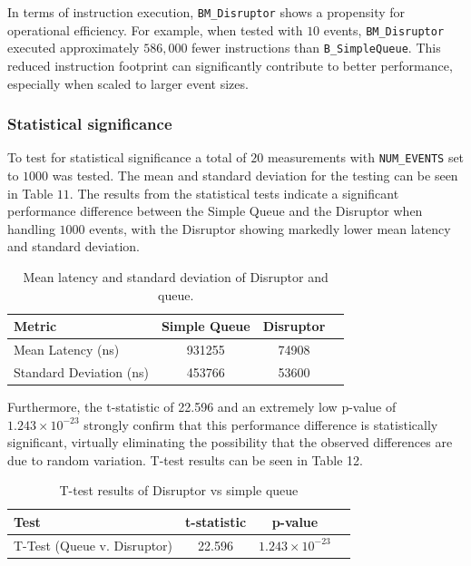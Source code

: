 \documentclass{article}
\theoremstyle{break}
\begin{document}
In terms of instruction execution, \texttt{BM\_Disruptor} shows a propensity for operational efficiency. For example, when tested with \(10\) events, \texttt{BM\_Disruptor} executed approximately \(586,000\) fewer instructions than \texttt{B\_SimpleQueue}. This reduced instruction footprint can significantly contribute to better performance, especially when scaled to larger event sizes.

\subsubsection*{Statistical significance}

To test for statistical significance a total of \(20\) measurements with \texttt{NUM\_EVENTS} set to \(1000\) was tested. The mean and standard deviation for the testing can be seen in Table \(11\). The results from the statistical tests indicate a significant performance difference between the Simple Queue and the Disruptor when handling \(1000\) events, with the Disruptor showing markedly lower mean latency and standard deviation.


\begin{table}[htbp]
\centering
\begin{tabular}{lccc}
\toprule
\textbf{Metric} & \textbf{Simple Queue} & \textbf{Disruptor} \\
\midrule
Mean Latency (ns) & 931255 & 74908  \\
Standard Deviation (ns) & 453766 & 53600  \\
\bottomrule
\end{tabular}
\caption{Mean latency and standard deviation of Disruptor and queue.}
\label{tab:optimisations}
\end{table}

\noindent Furthermore, the t-statistic of 22.596 and an extremely low p-value of \(1.243 \times 10^{-23}\) strongly confirm that this performance difference is statistically significant, virtually eliminating the possibility that the observed differences are due to random variation. T-test results can be seen in Table 12. 

\begin{table}[htbp]
\centering
\begin{tabular}{lccc}
\toprule
\textbf{Test} & \textbf{t-statistic} & \textbf{p-value} \\
\midrule
T-Test (Queue v. Disruptor) & 22.596 & \(1.243 \times 10^{-23}\)  \\
\bottomrule
\end{tabular}
\caption{T-test results of Disruptor vs simple queue}
\label{tab:optimisations}
\end{table}
\end{document}
